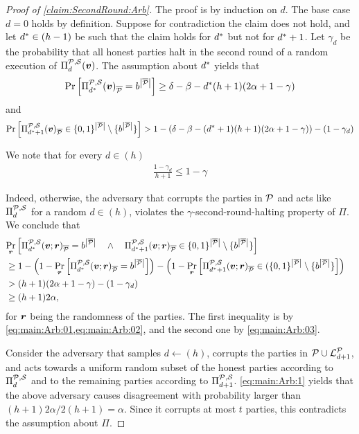 \begin{proof}[Proof of \cref{claim:SecondRound:Arb}]
The proof is by induction on $d$. The base case $d=0$ holds by definition. Suppose for contradiction the claim does not hold, and let ${d^\ast}\in(h-1)$
be such that the claim holds for ${d^\ast}$ but not for ${d^\ast}+1$. Let $\gamma_d$ be the probability that all honest parties halt in the second round of a random execution of $\Pi^{\mathcal{P},\mathcal{S}}_d({ \boldsymbol{v}})$. The assumption about ${d^\ast}$ yields that
\begin{align}\label{eq:main:Arb:01}
\Pr_{}\left[\Pi^{\mathcal{P},\mathcal{S}}_{d^\ast}({ \boldsymbol{v}})_{\overline{\mathcal{P}}} = b^{\left|{\overline{\mathcal{P}}}\right|}\right] \ge \delta- \beta- {d^\ast} (h+1)(2\alpha + 1-\gamma)
\end{align}
and
\begin{align}\label{eq:main:Arb:02}
\Pr_{}\left[\Pi^{\mathcal{P},\mathcal{S}}_{{d^\ast}+1}({ \boldsymbol{v}})_{\overline{\mathcal{P}}} \in \{0,1\}^{\left|{\overline{\mathcal{P}}}\right|} \setminus \{b^{\left|{\overline{\mathcal{P}}}\right|}\}\right] > 1-\left(\delta - \beta - ({d^\ast}+1) (h+1)(2\alpha + 1-\gamma)\right)- (1-\gamma_d)
\end{align}


We note that for every $d\in (h)$
\begin{align}\label{eq:main:Arb:03}
\frac{1- \gamma_d}{h+1} \le 1-\gamma
\end{align}


Indeed, otherwise, the adversary that corrupts the parties in $\mathcal{P}$ and acts like $\Pi^{\mathcal{P},\mathcal{S}}_d$ for a random $d\in (h)$, violates the $\gamma$-second-round-halting property of $\Pi$. We conclude that
\begin{align}\label{eq:main:Arb:1}
\lefteqn{\ppr{\vr}{\PP_\ds(\vv;\vr)_\oP = \o^{\size{\oP}} \qand \PP_{\ds+1}(\vv;\vr)_\oP \in \zo^{\size{\oP}} \setminus \sset{\o^{\size{\oP}}}}}\\
& \ge 1 - \left(1- \ppr{\vr}{\PP_\ds(\vv;\vr)_\oP = \o^{\size{\oP}}} \right) - \left(1- \ppr{\vr}{\PP_{\ds+1}(\vv;\vr)_\oP \in (\zo^{\size{\oP}} \setminus \sset{\o^{\size{\oP}}}}\right)\nonumber\\
& > (h+1) (2\alpha + 1 - \gamma) - (1-\gamma_d) \nonumber\\
& \ge (h+1) 2\alpha,\nonumber
\end{align}
for ${ \boldsymbol{r}}$ being the randomness of the parties. The first inequality is by \cref{eq:main:Arb:01,eq:main:Arb:02}, and the second one by \cref{eq:main:Arb:03}.

Consider the adversary that samples $d\gets (h)$, corrupts the parties in $\mathcal{P} \cup {\cal{L}}^{\mathcal{P}}_{d+1}$, and acts towards a uniform random subset of the honest parties according to $\Pi^{\mathcal{P},\mathcal{S}}_d$ and to the remaining parties according to $\Pi^{\mathcal{P},\mathcal{S}}_{d+1}$. \cref{eq:main:Arb:1} yields that the above adversary causes disagreement with probability larger than $(h+1) 2\alpha/2(h+1) = \alpha$. Since it corrupts at most $t$ parties, this contradicts the assumption about $\Pi$.
\end{proof}




